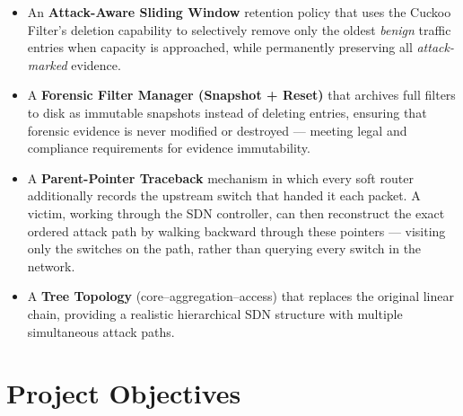 \documentclass[12pt, a4paper]{report}
\begin{document}
\begin{itemize}[leftmargin=*]
  \item An \textbf{Attack-Aware Sliding Window} retention policy that uses
  the Cuckoo Filter's deletion capability to selectively remove only the
  oldest \textit{benign} traffic entries when capacity is approached, while
  permanently preserving all \textit{attack-marked} evidence.
  \item A \textbf{Forensic Filter Manager (Snapshot + Reset)} that
  archives full filters to disk as immutable snapshots instead of deleting
  entries, ensuring that forensic evidence is never modified or destroyed
  --- meeting legal and compliance requirements for evidence immutability.
  \item A \textbf{Parent-Pointer Traceback} mechanism in which every soft
  router additionally records the upstream switch that handed it each
  packet. A victim, working through the SDN controller, can then
  reconstruct the exact ordered attack path by walking backward through
  these pointers --- visiting only the switches on the path, rather than
  querying every switch in the network.
  \item A \textbf{Tree Topology} (core--aggregation--access) that replaces
  the original linear chain, providing a realistic hierarchical SDN
  structure with multiple simultaneous attack paths.
\end{itemize}

\section{Project Objectives}
\end{document}
